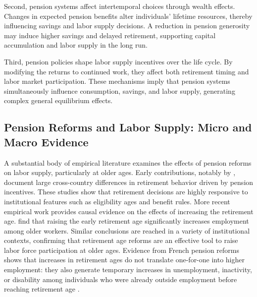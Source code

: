 \documentclass[11pt,english,a4paper, twoside, authoryear]{article}
\begin{document}
Second, pension systems affect intertemporal choices through wealth effects. Changes in expected pension benefits alter individuals' lifetime resources, thereby influencing savings and labor supply decisions. A reduction in pension generosity may induce higher savings and delayed retirement, supporting capital accumulation and labor supply in the long run.

Third, pension policies shape labor supply incentives over the life cycle. By modifying the returns to continued work, they affect both retirement timing and labor market participation. These mechanisms imply that pension systems simultaneously influence consumption, savings, and labor supply, generating complex general equilibrium effects.

\subsection{Pension Reforms and Labor Supply: Micro and Macro Evidence}

A substantial body of empirical literature examines the effects of pension reforms on labor supply, particularly at older ages. Early contributions, notably by \citet{GruberWise1999}, document large cross-country differences in retirement behavior driven by pension incentives. These studies show that retirement decisions are highly responsive to institutional features such as eligibility ages and benefit rules. More recent empirical work provides causal evidence on the effects of increasing the retirement age. \citet{StaubliZweimuller2013} find that raising the early retirement age significantly increases employment among older workers. Similar conclusions are reached in a variety of institutional contexts, confirming that retirement age reforms are an effective tool to raise labor force participation at older ages. Evidence from French pension reforms shows that increases in retirement ages do not translate one-for-one into higher employment: they also generate temporary increases in unemployment, inactivity, or disability among individuals who were already outside employment before reaching retirement age \citep{Rabate2020, Dubois2016, Leduigou2016}.
\end{document}
